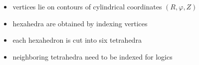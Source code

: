 \documentclass{beamer}
\begin{document}
\begin{frame}
\begin{columns}[onlytextwidth]
\begin{column}{0.45\textwidth}
	\end{column}
	\begin{column}{0.45\textwidth}
		\vspace{0 cm}
		\begin{center}
			\begin{itemize}
				\item vertices lie on contours of cylindrical coordinates $(R,\varphi,Z)$
				\item hexahedra are obtained by indexing vertices
				\item each hexahedron is cut into six tetrahedra
				\item neighboring tetrahedra need to be indexed for logics
			\end{itemize}
		\end{center}
	\end{column}
\end{columns}
\end{frame}
\end{document}
